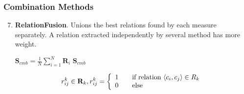 \documentclass{beamer}
\begin{document}
\begin{frame}
\frametitle{Combination Methods}

\begin{enumerate}
  \setcounter{enumi}{6}
  \item \textbf{RelationFusion}. Unions the best relations found by each measure separately. A relation  extracted independently by several method has more weight. 

\begin{algorithm}[H]
\SetLine
{}

$\mathbf{S}_{cmb} = \frac{1}{N} \sum_{i=1}^N \mathbf{R}_i$ \;
\Return $\mathbf{S}_{cmb}$ \;
\label{rfusion}
\end{algorithm}
$$
r^k_{ij} \in \mathbf{R}_k, r_{ij}^k = \left\{ 
  \begin{array}{l l}
    1 & \quad \text{if relation } \langle c_i, c_j \rangle \in R_k \\
    0 & \quad \text{else}\\
  \end{array} \right.
$$

\end{enumerate}

\end{frame}
\end{document}
